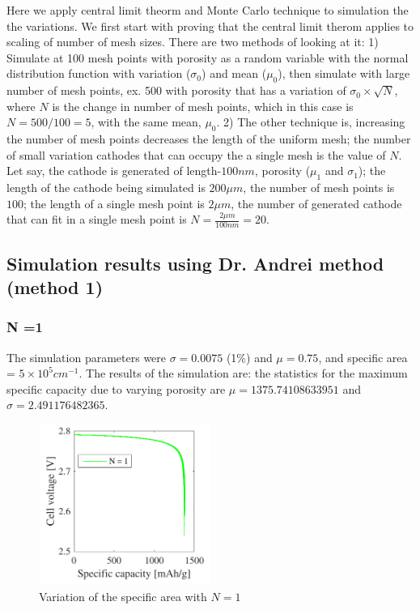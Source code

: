 \documentclass[12pt]{book}
\begin{document}
Here we apply central limit theorm and Monte Carlo technique to simulation
the the variations. We first start with proving that the central limit
therom applies to scaling of number of mesh sizes. There are two methods
of looking at it: 1) Simulate at 100 mesh points with porosity as
a random variable with the normal distribution function with variation
($\sigma_{0}$) and mean ($\mu_{0}$), then simulate with large number
of mesh points, ex. 500 with porosity that has a variation of $\sigma_{0}\times\sqrt{N}$,
where $N$ is the change in number of mesh points, which in this case
is $N=500/100=5$, with the same mean, $\mu_{0}$. 2) The other technique
is, increasing the number of mesh points decreases the length of the
uniform mesh; the number of small variation cathodes that can occupy
the a single mesh is the value of $N$. Let say, the cathode is generated
of length-$100nm$, porosity ($\mu_{1}$ and $\sigma_{1}$); the length
of the cathode being simulated is $200\mu m$, the number of mesh
points is $100$; the length of a single mesh point is $2\mu m$,
the number of generated cathode that can fit in a single mesh point
is $N=\frac{2\mu m}{100nm}=20.$ 

\subsection{Simulation results using Dr. Andrei method (method 1)}

\subsubsection{N =1}

The simulation parameters were $\sigma=0.0075$ (1\%) and $\mu=0.75$,
and specific area = $5\times10^{5}cm^{-1}$. The results of the simulation
are: the statistics for the maximum specific capacity due to varying
porosity are $\mu=1375.74108633951$ and $\sigma=2.491176482365$.
\begin{figure}[htb]
	\centering
	\includegraphics[width=0.5\textwidth]{figures/Petru_N_1_012016}
	\caption{Variation of the specific area with $N = 1$}
\end{figure}
\end{document}
